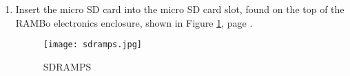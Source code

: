 \begin{enumerate}
\item Insert the micro SD card into the micro SD card slot, found on the top of the RAMBo electronics enclosure, shown in
Figure \ref{fig:sdramps}, page \pageref{fig:sdramps}.
\begin{figure}[hbt]
\centering
\texttt{[image: sdramps.jpg]}
\caption{SDRAMPS}
\label{fig:sdramps}
\end{figure}

\end{enumerate}
